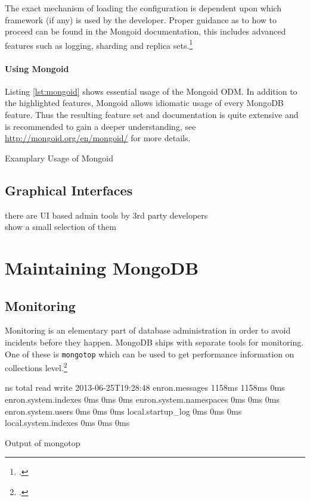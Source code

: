 The exact mechanism of loading the configuration is dependent upon which
framework (if any) is used by the developer. Proper guidance as to how to
proceed can be found in the Mongoid documentation, this includes advanced
features such as logging, sharding and replica
sets.\footcite[Cf.][]{mongoid_install}

\paragraph{Using Mongoid}
Listing \ref{lst:mongoid} shows essential usage of the Mongoid ODM. In addition
to the highlighted features, Mongoid allows idiomatic usage of every MongoDB
feature.
Thus the resulting feature set and documentation is quite extensive and is
recommended to gain a deeper understanding, see
\url{http://mongoid.org/en/mongoid/} for more details.

\begin{code}
	\caption{Examplary Usage of Mongoid}
	\label{lst:mongoid}
\end{code}

\subsection{Graphical Interfaces}
\label{sec:usage-gui}
there are UI based admin tools by 3rd party developers\\
show a small selection of them

\newpage
\section{Maintaining MongoDB}
\label{sec:maintenance}

\subsection{Monitoring}
\label{sec:maintenance-monitroing}
Monitoring is an elementary part of database administration in order to avoid
incidents before they happen. MongoDB ships with separate tools for monitoring.
One of these is \texttt{mongotop} which can be used to get performance information
on collections level.\footcite[Cf.][]{mongo_monitoring}
\begin{listing}
    \begin{bashcode}
                            ns       total        read       write
2013-06-25T19:28:48
                enron.messages      1158ms      1158ms         0ms
          enron.system.indexes         0ms         0ms         0ms
       enron.system.namespaces         0ms         0ms         0ms
            enron.system.users         0ms         0ms         0ms
             local.startup_log         0ms         0ms         0ms
          local.system.indexes         0ms         0ms         0ms
    \end{bashcode}
    \caption{Output of mongotop}
    \label{lst:mongotop}
\end{listing}

